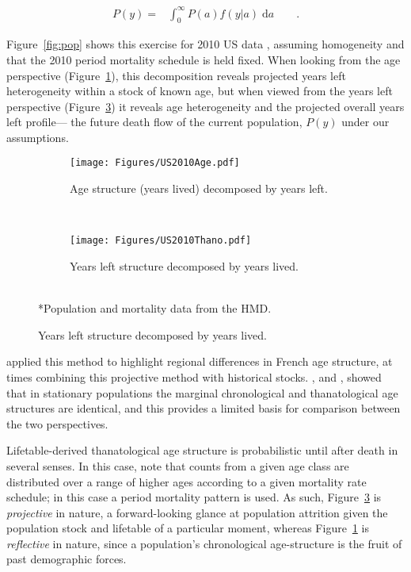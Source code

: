 \documentclass[12pt,oneside,a4paper,leqno]{article}
\newcommand{\dd}{\; \mathrm{d}}
\newcommand{\ep}{\quad\quad\text{.}}
\begin{document}
\begin{align}
\label{eq:transform}
P(y) =& \int_0^\infty P(a) f(y | a) \dd a \ep
\end{align}

Figure~\ref{fig:pop} shows this exercise for 2010 US data \citep{HMD},
assuming homogeneity and that the 2010 period mortality schedule is held fixed.
When looking from the age perspective (Figure~\ref{fig:USdecomp}), this
decomposition reveals projected years left heterogeneity within a stock of known age, but when viewed from the
years left perspective (Figure~\ref{fig:USrecomp}) it reveals age heterogeneity
and the projected overall years left profile--- the future death flow of the
current population, $P(y)$ under our assumptions.

\begin{figure}[ht!]
	\caption{2010 US population structure}
	\label{fig:pop}
	\begin{center}
	\begin{subfigure}{.45\textwidth}
		\caption{Age structure (years lived) decomposed by years left.}
		\label{fig:USdecomp}
		\texttt{[image: Figures/US2010Age.pdf]}
	\end{subfigure}
	~
	\begin{subfigure}{.45\textwidth}
		\caption{Years left structure decomposed by years lived.}
		\label{fig:USrecomp}
		\texttt{[image: Figures/US2010Thano.pdf]}
	\end{subfigure}
	\\
	\small{*Population and mortality data from the HMD.}
	\end{center}
\end{figure}

\citet{brouard1986structure} applied this method to highlight regional
differences in French age structure, at times combining this projective method
with historical stocks. \citet{brouard1989mouvements}, and \citet{vaupel2009life}, showed that in stationary populations the
marginal chronological and thanatological age structures are identical, and this
provides a limited basis for comparison between the two perspectives. 

Lifetable-derived thanatological age structure is
probabilistic until after death in several senses. In this case, note that
counts from a given age class are distributed over a range of higher ages
according to a given mortality rate schedule; in this
case a period mortality pattern is used.
As such, Figure~\ref{fig:USrecomp} is \textit{projective} in nature, a
forward-looking glance at population attrition given the population stock and lifetable of a
particular moment, whereas Figure~\ref{fig:USdecomp} is \textit{reflective} in
nature, since a population's chronological age-structure is the fruit of past
demographic forces.
\end{document}
